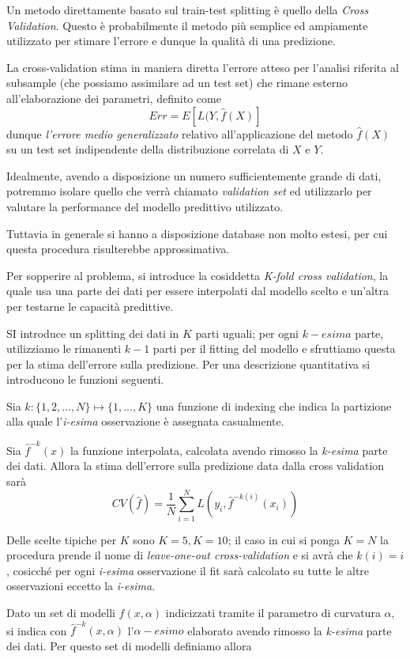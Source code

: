 \documentclass[a4paper]{report}
\begin{document}
Un metodo direttamente basato sul train-test splitting è quello della \textit{Cross Validation}.
Questo è probabilmente il metodo più semplice ed ampiamente utilizzato per stimare l'errore e dunque la qualità di una predizione.

La cross-validation stima in maniera diretta l'errore atteso per l'analisi riferita al subsample (che possiamo assimilare ad un test set) che rimane esterno all'elaborazione dei parametri, definito come
\[
Err=E[L(Y,\hat{f}(X)]
\]
dunque \textit{l'errore medio generalizzato} relativo all'applicazione del metodo $\hat{f}(X)$ su un test set indipendente della distribuzione correlata di $X$ e $Y$.

Idealmente, avendo a disposizione un numero sufficientemente grande di dati, potremmo isolare quello che verrà chiamato \textit{validation set} ed utilizzarlo per valutare la performance del modello predittivo utilizzato.

Tuttavia in generale si hanno a disposizione database non molto estesi, per cui questa procedura risulterebbe approssimativa.

Per sopperire al problema, si introduce la cosiddetta \textit{K-fold cross validation}, la quale usa una parte dei dati per essere interpolati dal modello scelto e un'altra per testarne le capacità predittive.

SI introduce un splitting dei dati in $K$ parti uguali; per ogni $k-esima$ parte, utilizziamo le rimanenti $k-1$ parti per il fitting del modello e sfruttiamo questa per la stima dell'errore sulla predizione.
Per una descrizione quantitativa si introducono le funzioni seguenti.

Sia $k:\{1,2,...,N\}\longmapsto\{1,...,K\}$ una funzione di indexing che indica la partizione alla quale l'\textit{i-esima} osservazione è assegnata casualmente.

Sia $\hat{f}^{-k}(x)$ la funzione interpolata, calcolata avendo rimosso la \textit{k-esima} parte dei dati.
Allora la stima dell'errore sulla predizione data dalla cross validation sarà
\[
CV(\hat{f})=\frac{1}{N}\sum^{N}_{i=1}L(y_i,\hat{f}^{-k(i)}(x_i))
\]

Delle scelte tipiche per $K$ sono $K=5,K=10$; il caso in cui si ponga $K=N$ la procedura prende il nome di \textit{leave-one-out cross-validation} e si avrà che $k(i)=i$, cosicché per ogni \textit{i-esima} osservazione il fit sarà calcolato su tutte le altre osservazioni eccetto la \textit{i-esima}.

Dato un set di modelli $f(x,\alpha)$ indicizzati tramite il parametro di curvatura $\alpha$, si indica con $\hat{f}^{-k}(x,\alpha)$ l'$\alpha-esimo$ elaborato avendo rimosso la \textit{k-esima} parte dei dati.
Per questo set di modelli definiamo allora
\end{document}
